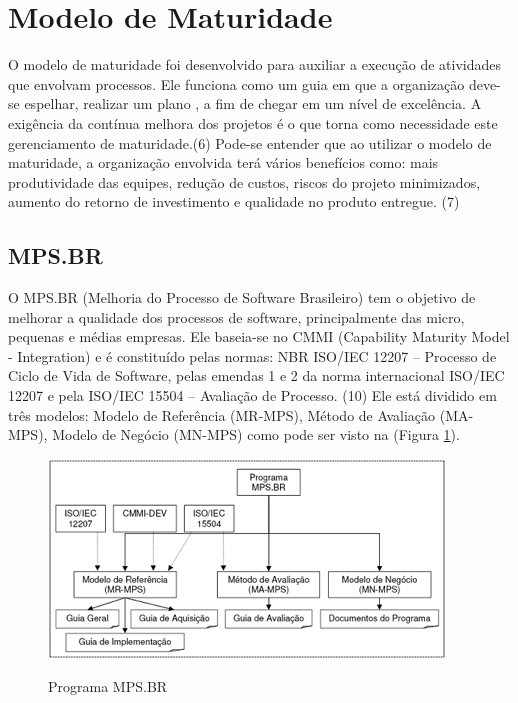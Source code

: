 \section {Modelo de Maturidade}

O modelo de maturidade foi desenvolvido para auxiliar a execução de atividades que envolvam processos. Ele funciona como um guia em que a organização deve-se  espelhar, realizar um plano , a fim de chegar em um nível de excelência. A exigência da contínua melhora dos projetos é o que torna como necessidade este gerenciamento de maturidade.(6)
Pode-se entender que ao utilizar o modelo de maturidade, a organização envolvida terá vários benefícios como: mais produtividade das equipes, redução de custos, riscos do projeto minimizados, aumento do retorno de investimento e qualidade no produto entregue. (7)

\subsection {MPS.BR}

O MPS.BR (Melhoria do Processo de Software Brasileiro) tem o objetivo de melhorar a qualidade dos processos de software, principalmente das micro, pequenas e médias empresas. Ele baseia-se no CMMI (Capability Maturity Model - Integration) e é constituído pelas normas: NBR ISO/IEC 12207 – Processo de Ciclo de Vida de Software, pelas emendas 1 e 2 da norma internacional ISO/IEC 12207 e pela ISO/IEC 15504 – Avaliação de Processo. (10)
Ele está dividido em três modelos: Modelo de Referência (MR-MPS), Método de Avaliação (MA-MPS), Modelo de Negócio (MN-MPS) como pode ser visto na (Figura \ref{img:mps2}).

\begin{figure}[H]
		\centering
		\caption{Programa MPS.BR}
		\includegraphics{figuras/mps2}
		\label{img:mps2}
\end{figure}

